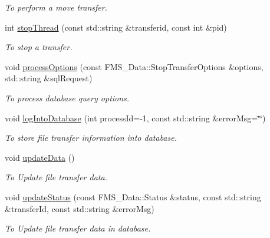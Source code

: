 \begin{DoxyCompactItemize}
\begin{DoxyCompactList}\small\item\em To perform a move transfer. \item\end{DoxyCompactList}\item 
int \hyperlink{classFileTransferServer_a9a2974fdbd80f765d3727ed74e38c9b7}{stopThread} (const std::string \&transferid, const int \&pid)
\begin{DoxyCompactList}\small\item\em To stop a transfer. \item\end{DoxyCompactList}\item 
void \hyperlink{classFileTransferServer_a4f086a80ff1a621709b6c153bdabc5b5}{processOptions} (const FMS\_\-Data::StopTransferOptions \&options, std::string \&sqlRequest)
\begin{DoxyCompactList}\small\item\em To process database query options. \item\end{DoxyCompactList}\item 
void \hyperlink{classFileTransferServer_a2c1a6715aa823eb3cda6f7bb044628dc}{logIntoDatabase} (int processId=-\/1, const std::string \&errorMsg=\char`\"{}\char`\"{})
\begin{DoxyCompactList}\small\item\em To store file transfer information into database. \item\end{DoxyCompactList}\item 
\hypertarget{classFileTransferServer_ad2f26789b7f1dda7552263f9b1bebb5f}{
void \hyperlink{classFileTransferServer_ad2f26789b7f1dda7552263f9b1bebb5f}{updateData} ()}
\label{classFileTransferServer_ad2f26789b7f1dda7552263f9b1bebb5f}

\begin{DoxyCompactList}\small\item\em To Update file transfer data. \item\end{DoxyCompactList}\item 
void \hyperlink{classFileTransferServer_a05bff800da5a38808ccd9396d02ddd52}{updateStatus} (const FMS\_\-Data::Status \&status, const std::string \&transferId, const std::string \&errorMsg)
\begin{DoxyCompactList}\small\item\em To Update file transfer data in database. \item\end{DoxyCompactList}\end{DoxyCompactItemize}
